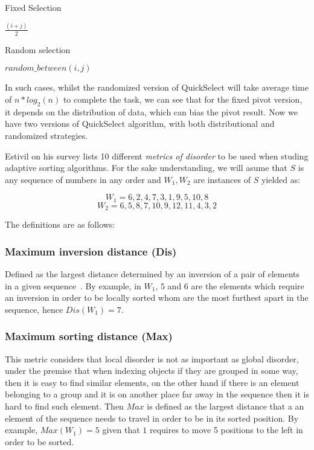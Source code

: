 \begin{algorithm}
  \caption{Fixed Selection}\label{ALG:Select_fixed}
  \begin{algorithmic}[1]
    \State \Return $\frac{(i+j)}{2}$
    \EndProcedure
  \end{algorithmic}
\end{algorithm}

\begin{algorithm}
  \caption{Random selection}\label{ALG:Select_random}
  \begin{algorithmic}[1]
    \State \Return $random\_between(i,j)$
    \EndProcedure
  \end{algorithmic}
\end{algorithm}

In such cases, whilst the randomized version of QuickSelect will take average time of $n*log_2(n)$ to complete the task, we can see that for the fixed pivot version, it depends on the distribution of data, which can bias the pivot result. Now we have two versions of QuickSelect algorithm, with both distributional and randomized strategies.

Estivil \cite{estivil92} on his survey lists 10 different \textit{metrics of disorder} to be used when studing adaptive sorting algorithms. For the sake understanding, we will asume that $S$ is any sequence of numbers in any order and $W_1,W_2$ are instances of $S$ yielded as: 

$$W_1 = {6,2,4,7,3,1,9,5,10,8}$$
$$W_2 = {6,5,8,7,10,9,12,11,4,3,2}$$

The definitions are as follows:

\subsubsection{Maximum inversion distance (Dis)}
Defined as the largest distance determined by an inversion of a pair of elements in a given sequence~\cite{Estivill-Castro_Wood_1989}.  By example, in $W_1$,  $5$ and $6$ are the elements which require an inversion in order to be locally sorted whom are the most furthest apart in the sequence, hence $Dis(W_1) = 7$.

\subsubsection{Maximum sorting distance (Max)}
This metric considers that local disorder is not as important as global disorder, under the premise that when indexing objects if they are grouped in some way, then it is easy to find similar elements, on the other hand if there is an element belonging to a group and it is on another place far away in the sequence then it is hard to find such element. Then $Max$ is defined as the largest distance that a an element of the sequence needs to travel in order to be in its sorted position\cite{Estivill-Castro_Wood_1989}. By example, $Max(W_1) = 5$ given that $1$ requires to move 5 positions to the left in order to be sorted.

